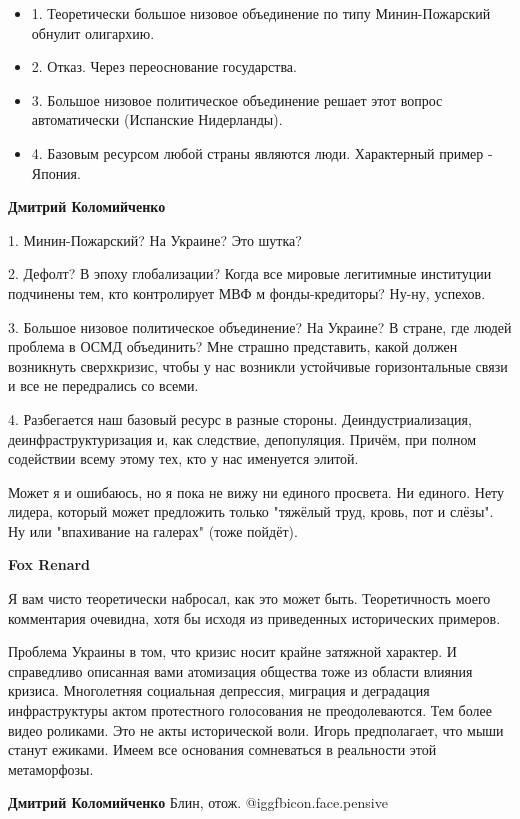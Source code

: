 \begin{itemize}
\begin{itemize}
\begin{itemize}
  \item 1. Теоретически большое низовое объединение по типу Минин-Пожарский обнулит олигархию.
  \item 2. Отказ. Через переоснование государства.
  \item 3. Большое низовое политическое объединение решает этот вопрос автоматически (Испанские Нидерланды).
  \item 4. Базовым ресурсом любой страны являются люди. Характерный пример - Япония.
\end{itemize}

\textbf{Дмитрий Коломийченко} 

1. Минин-Пожарский? На Украине? Это шутка?

2. Дефолт? В эпоху глобализации? Когда все мировые легитимные институции
подчинены тем, кто контролирует МВФ м фонды-кредиторы? Ну-ну, успехов.

3. Большое низовое политическое объединение? На Украине? В стране, где людей
проблема в ОСМД объединить? Мне страшно представить, какой должен возникнуть
сверхкризис, чтобы у нас возникли устойчивые горизонтальные связи и все не
передрались со всеми.

4. Разбегается наш базовый ресурс в разные стороны. Деиндустриализация,
деинфраструктуризация и, как следствие, депопуляция. Причём, при полном
содействии всему этому тех, кто у нас именуется элитой.

Может я и ошибаюсь, но я пока не вижу ни единого просвета. Ни единого. Нету
лидера, который может предложить только "тяжёлый труд, кровь, пот и слёзы". Ну
или "впахивание на галерах" (тоже пойдёт).

\textbf{Fox Renard} 

Я вам чисто теоретически набросал, как это может быть. Теоретичность моего
комментария очевидна, хотя бы исходя из приведенных исторических примеров.

Проблема Украины в том, что кризис носит крайне затяжной характер. И
справедливо описанная вами атомизация общества тоже из области влияния кризиса.
Многолетняя социальная депрессия, миграция и деградация инфраструктуры актом
протестного голосования не преодолеваются. Тем более видео роликами. Это не
акты исторической воли. Игорь предполагает, что мыши станут ежиками. Имеем все
основания сомневаться в реальности этой метаморфозы.

\textbf{Дмитрий Коломийченко} Блин, отож.  @igg{fbicon.face.pensive} 


\end{itemize}
\end{itemize}
